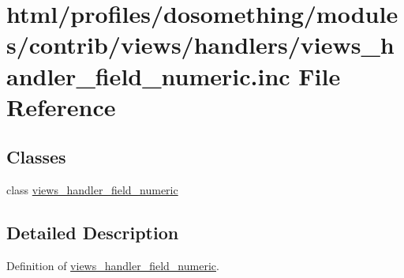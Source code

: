\hypertarget{views__handler__field__numeric_8inc}{
\section{html/profiles/dosomething/modules/contrib/views/handlers/views\_\-handler\_\-field\_\-numeric.inc File Reference}
\label{views__handler__field__numeric_8inc}
}
\subsection*{Classes}
\begin{DoxyCompactItemize}
\item 
class \hyperlink{classviews__handler__field__numeric}{views\_\-handler\_\-field\_\-numeric}
\end{DoxyCompactItemize}


\subsection{Detailed Description}
Definition of \hyperlink{classviews__handler__field__numeric}{views\_\-handler\_\-field\_\-numeric}. 